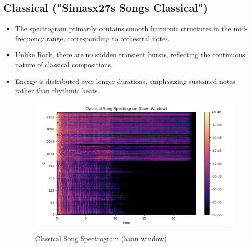 \documentclass[a4paper,12pt]{article}
\begin{document}
\subsection{Classical ("Simasx27s Songs Classical")}
\begin{itemize}
\item The spectrogram primarily contains smooth harmonic structures in the mid-frequency range, corresponding to orchestral notes.
\item Unlike Rock, there are no sudden transient bursts, reflecting the continuous nature of classical compositions.
\item   Energy is distributed over longer durations, emphasizing sustained notes rather than rhythmic beats.
\begin{figure}[H]
    \centering
    \includegraphics[width=1\linewidth]{ClassicalSPG.png}
    \caption{Classical Song Spectrogram (hann window)}
    \label{fig:enter-label}
\end{figure}
\end{itemize}
\newpage
\end{document}
